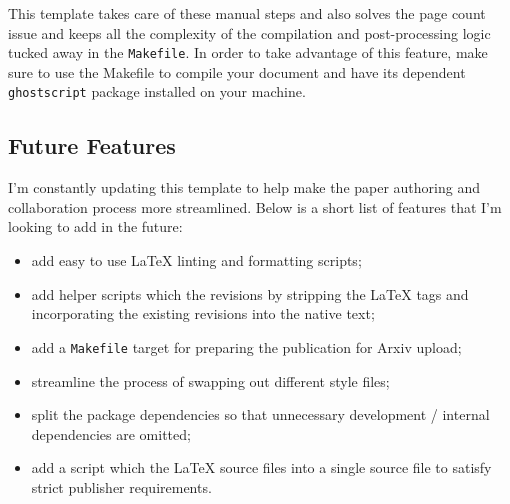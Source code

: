 This template takes care of these manual steps and also solves the page count issue and keeps all the complexity of the compilation and post-processing logic tucked away in the \texttt{Makefile}.
In order to take advantage of this feature, make sure to use the Makefile to compile your document and have its dependent \texttt{ghostscript} package installed on your machine.

\subsection{Future Features}
\label{sec:howto:future-features}

I'm constantly updating this template to help make the paper authoring and collaboration process more streamlined.
Below is a short list of features that I'm looking to add in the future:
%
\begin{itemize}
    \item add easy to use \LaTeX{} linting and formatting scripts;
    \item add helper scripts which  the revisions by stripping the \LaTeX{} tags and incorporating the existing revisions into the native text;
    \item add a \texttt{Makefile} target for preparing the publication for Arxiv upload;
    \item streamline the process of swapping out different style files;
    \item split the package dependencies so that unnecessary development / internal dependencies are omitted;
    \item add a script which  the \LaTeX{} source files into a single source file to satisfy strict publisher requirements.
\end{itemize}
